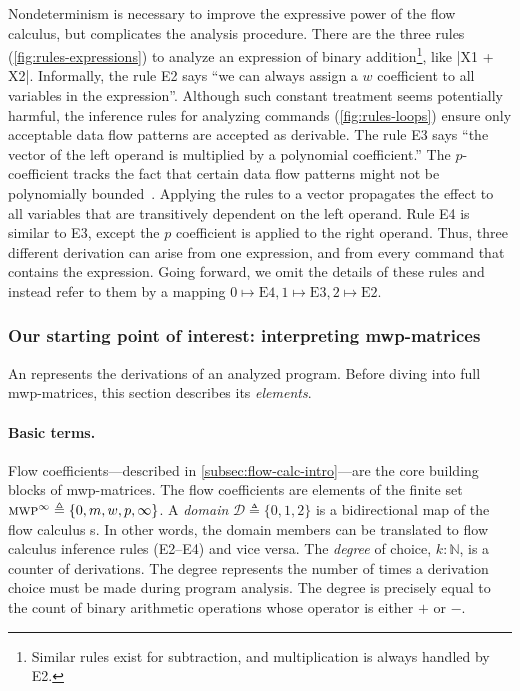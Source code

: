 Nondeterminism is necessary to improve the expressive power of the flow calculus, but complicates the analysis procedure.
There are the three rules (\autoref{fig:rules-expressions}) to analyze an expression of binary addition\footnote{
    Similar rules exist for subtraction, and multiplication is always handled by E2.}, like \pr|X1 + X2|.
Informally, the rule E2 says \enquote{we can always assign a \(w\) coefficient to all variables in the expression}.
Although such constant treatment seems  potentially harmful, the inference rules for analyzing commands (\autoref{fig:rules-loops}) ensure only acceptable data flow patterns are accepted as derivable.
The rule E3 says \enquote{the vector of the left operand is multiplied by a polynomial coefficient.}
The \(p\)-coefficient tracks the fact that certain data flow patterns might not be polynomially bounded~\cite[p. 13]{jones2009}.
Applying the rules to a vector propagates the effect to all variables that are transitively dependent on the left operand.
Rule E4 is similar to E3, except the \(p\) coefficient is applied to the right operand.
Thus, three different derivation can arise from one expression, and from every command that contains the expression.
Going forward, we omit the details of these rules and instead refer to them by a mapping \(0 \mapsto \text{E4}, 1 \mapsto \text{E3}, 2 \mapsto \text{E2}\).

\subsubsection{Our starting point of interest: interpreting mwp-matrices}
\label{subsec:mat-decode}

An  represents the derivations of an analyzed program. Before
diving into full mwp-matrices, this section describes its \emph{elements}.

\paragraph*{Basic terms.}
Flow coefficients---described in \autoref{subsec:flow-calc-intro}---are the core building blocks of mwp-matrices.
The flow coefficients are elements of the finite set \(\text{\textsc{mwp}}^\infty \triangleq \{0, m, w, p,\infty\}\).
A \emph{domain} \(\mathcal{D} \triangleq \{0, 1, 2 \}\) is a bidirectional map of the flow calculus s.
In other words, the domain members can be translated to flow calculus inference rules (E2--E4) and vice versa.
The \emph{degree} of choice, \(k : \mathbb{N}\), is a counter of derivations.
The degree represents the number of times a derivation choice must be made during program analysis.
The degree is precisely equal to the count of binary arithmetic operations whose operator is either \(+\) or \(-\).

